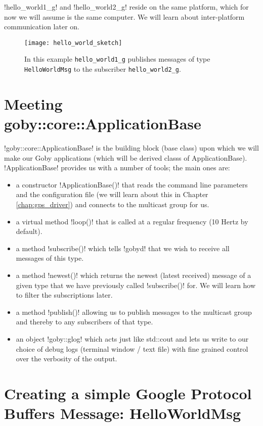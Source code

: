 !hello_world1_g! and !hello_world2_g! reside on the same \gls{platform}, which for now we will assume is the same computer. We will learn about inter-platform communication later on.

\begin{figure}
\centering
\texttt{[image: hello\_world\_sketch]}
\caption{In this example \texttt{hello\_world1\_g} publishes messages of type \texttt{HelloWorldMsg} to the subscriber \texttt{hello\_world2\_g}.}
\label{fig:hello_world_sketch}
\end{figure}

\section{Meeting goby::core::ApplicationBase}

!goby::core::ApplicationBase! is the building block (\gls{base class}) upon which we will make our Goby applications (which will be \glspl{derived class} of ApplicationBase). !ApplicationBase! provides us with a number of tools; the main ones are:

\begin{itemize}
\item a constructor !ApplicationBase()! that reads the command line parameters and the configuration file (we will learn about this in Chapter \ref{chap:gps_driver}) and connects to the \gls{multicast} group for us.
\item a virtual method !loop()! that is called at a regular frequency (10 Hertz by default).
\item a method !subscribe()! which tells !gobyd! that we wish to receive all messages of this type.
\item a method !newest()! which returns the newest (latest received) message of a given type that we have previously called !subscribe()! for. We will learn how to filter the subscriptions later.
\item a method !publish()! allowing us to publish messages to the multicast group and thereby to any subscribers of that type.
\item an object !goby::glog! which acts just like std::cout and lets us write to our choice of debug logs (terminal window / text file) with fine grained control over the verbosity of the output.
\end{itemize}

\section{Creating a simple Google Protocol Buffers Message: HelloWorldMsg}\label{sec:proto_ex}


